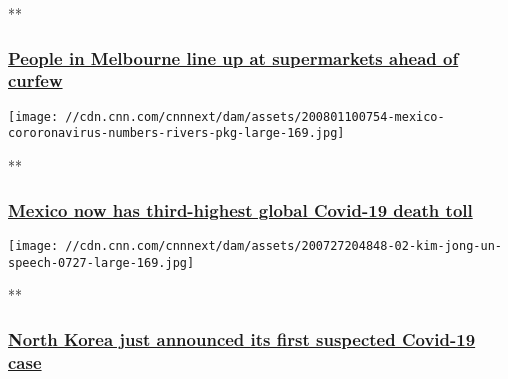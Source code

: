 **

\hypertarget{people-in-melbourne-line-up-at-supermarkets-ahead-of-curfew}{%
\subsubsection{\texorpdfstring{\href{/videos/world/2020/08/03/australian-victoria-melbourne-coronavirus-covid-19-state-of-disaster-intl-hnk-vpx.cnn/video/playlists/coronavirus-intl/}{People
in Melbourne line up at supermarkets ahead of
curfew}}{People in Melbourne line up at supermarkets ahead of curfew}}\label{people-in-melbourne-line-up-at-supermarkets-ahead-of-curfew}}

\href{/videos/world/2020/08/01/mexico-coronavirus-death-toll-rivers-pkg-vpx.cnn/video/playlists/coronavirus-intl/}{}

\texttt{[image: //cdn.cnn.com/cnnnext/dam/assets/200801100754-mexico-cororonavirus-numbers-rivers-pkg-large-169.jpg]}

**

\hypertarget{mexico-now-has-third-highest-global-covid-19-death-toll}{%
\subsubsection{\texorpdfstring{\href{/videos/world/2020/08/01/mexico-coronavirus-death-toll-rivers-pkg-vpx.cnn/video/playlists/coronavirus-intl/}{Mexico
now has third-highest global Covid-19 death
toll}}{Mexico now has third-highest global Covid-19 death toll}}\label{mexico-now-has-third-highest-global-covid-19-death-toll}}

\href{/videos/world/2020/08/01/north-korea-coronavirus-ripley-pkg-vpx.cnn/video/playlists/coronavirus-intl/}{}

\texttt{[image: //cdn.cnn.com/cnnnext/dam/assets/200727204848-02-kim-jong-un-speech-0727-large-169.jpg]}

**

\hypertarget{north-korea-just-announced-its-first-suspected-covid-19-case-}{%
\subsubsection{\texorpdfstring{\href{/videos/world/2020/08/01/north-korea-coronavirus-ripley-pkg-vpx.cnn/video/playlists/coronavirus-intl/}{North
Korea just announced its first suspected Covid-19 case
}}{North Korea just announced its first suspected Covid-19 case }}\label{north-korea-just-announced-its-first-suspected-covid-19-case-}}

